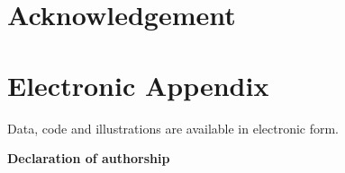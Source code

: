 \documentclass[12pt]{article}
\begin{document}
\listoffigures
% 

\newpage


\listoftables
% 

\newpage

\newpage
\section*{Acknowledgement}

\newpage

    

\setcounter{page}{5} %

\appendix

% 

\section{Electronic Appendix}
\label{el_app}


Data, code and illustrations are available in electronic form. \bigskip

% 


\RaggedRight
% 
% 
\printbibliography
\newpage
\Large
\noindent
\textbf{Declaration of authorship} 
\vspace{0.5cm}
\noindent
\normalsize
\end{document}
